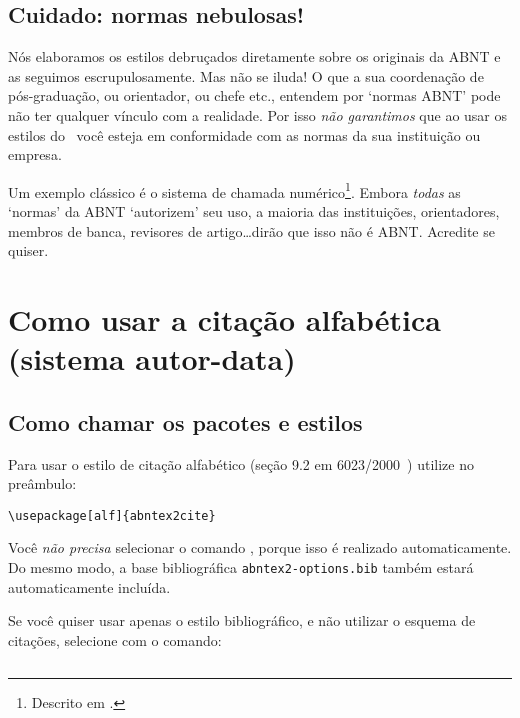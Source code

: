 \documentclass[a4paper]{ltxdoc}
\begin{document}
\subsection{Cuidado: normas nebulosas!}

Nós elaboramos os estilos debruçados diretamente sobre os originais da ABNT
e as seguimos escrupulosamente. Mas não se iluda! O que a sua coordenação
de pós-graduação, ou orientador, ou chefe etc., entendem por `normas ABNT'
pode não ter qualquer vínculo com a realidade. Por isso \emph{não garantimos}
que ao usar os estilos do \abnTeX\ você esteja em conformidade com as normas
da sua instituição ou empresa.

Um exemplo clássico é o sistema de chamada numérico\footnote{Descrito em
.}. Embora \emph{todas} as `normas' da ABNT
\cite{NBR10520:1988,NBR6023:2000,NBR6023:2002,NBR6023:2002,NBR10520:2001,NBR10520:2002}
`autorizem' seu uso, a maioria das instituições, orientadores, membros de banca,
revisores de artigo\ldots dirão que isso não é ABNT. Acredite se quiser.

\section{Como usar a citação alfabética (sistema autor-data)}

\subsection{Como chamar os pacotes e estilos}

\DescribeMacro{\usepackage[alf]{abntex2cite}}
Para usar o estilo de citação alfabético (seção 9.2 em
6023/2000~\cite{NBR6023:2000}) utilize no preâmbulo:

\begin{verbatim}
\usepackage[alf]{abntex2cite}
\end{verbatim}

\DescribeMacro{}
Você \emph{não precisa} selecionar o comando \verb++, porque
isso é realizado automaticamente. Do mesmo modo, a base bibliográfica
\verb+abntex2-options.bib+ também estará automaticamente incluída.

Se você quiser usar apenas o estilo bibliográfico, e não utilizar o esquema de
citações, selecione com o comando:

\begin{verbatim}

\end{verbatim}
\end{document}
